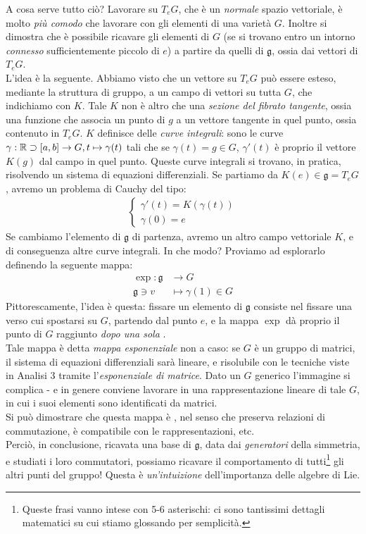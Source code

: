 \documentclass[../../FisicaTeorica.tex]{subfiles}
\begin{document}
\begin{expl}
A cosa serve tutto ciò? Lavorare su $T_e G$, che è un \textit{normale} spazio vettoriale, è molto \textit{più comodo} che lavorare con gli elementi di una varietà $G$. Inoltre si dimostra che è possibile ricavare gli elementi di $G$ (se si trovano entro un intorno \textit{connesso} sufficientemente piccolo di $e$) a partire da quelli di $\mathfrak{g}$, ossia dai vettori di $T_eG$.\\
L'idea è la seguente. Abbiamo visto che un vettore su $T_eG$ può essere esteso, mediante la struttura di gruppo, a un campo di vettori su tutta $G$, che indichiamo con $K$. Tale $K$ non è altro che una \textit{sezione del fibrato tangente}, ossia una funzione che associa un punto di $g$ a un vettore tangente in quel punto, ossia contenuto in $T_eG$. $K$ definisce delle \textit{curve integrali}: sono le curve $\gamma:\mathbb{R}\supset [a,b] \to G, t\mapsto \gamma(t)$ tali che se $\gamma(t)=g \in G$, $\gamma'(t)$ è proprio il vettore $K(g)$  dal campo in quel punto. Queste curve integrali si trovano, in pratica, risolvendo un sistema di equazioni differenziali. Se partiamo da $K(e) \in \mathfrak{g} = T_eG$, avremo un problema di Cauchy del tipo:
\begin{align*}
\begin{cases}
\gamma'(t) = K(\gamma(t))\\
\gamma(0) = e
\end{cases}
\end{align*}
Se cambiamo l'elemento di $\mathfrak{g}$ di partenza, avremo un altro campo vettoriale $K$, e di conseguenza altre curve integrali. In che modo? Proviamo ad esplorarlo definendo la seguente mappa:
\begin{align*}
\exp: \mathfrak{g}&\to G\\
\mathfrak{g} \ni v &\mapsto \gamma(1) \in G
\end{align*}
Pittorescamente, l'idea è questa: fissare un elemento di $\mathfrak{g}$ consiste nel fissare una  verso cui spostarsi su $G$, partendo dal punto $e$, e la mappa $\exp$ dà proprio il punto di $G$ raggiunto \textit{dopo una sola }.\\
Tale mappa è detta \textit{mappa esponenziale} non a caso: se $G$ è un gruppo di matrici, il sistema di equazioni differenziali sarà lineare, e risolubile con le tecniche viste in Analisi 3 tramite l'\textit{esponenziale di matrice}. Dato un $G$ generico l'immagine si complica - e in genere conviene lavorare in una rappresentazione lineare di tale $G$, in cui i suoi elementi sono identificati da matrici.\\
Si può dimostrare che questa mappa è , nel senso che preserva relazioni di commutazione, è compatibile con le rappresentazioni, etc.\\
Perciò, in conclusione, ricavata una base di $\mathfrak{g}$, data dai \textit{generatori} della simmetria, e studiati i loro commutatori, possiamo ricavare il comportamento di tutti\footnote{Queste frasi vanno intese con 5-6 asterischi: ci sono tantissimi dettagli matematici su cui stiamo glossando per semplicità.} gli altri punti del gruppo! Questa è \textit{un'intuizione} dell'importanza delle algebre di Lie.\\


\end{expl}
\end{document}
